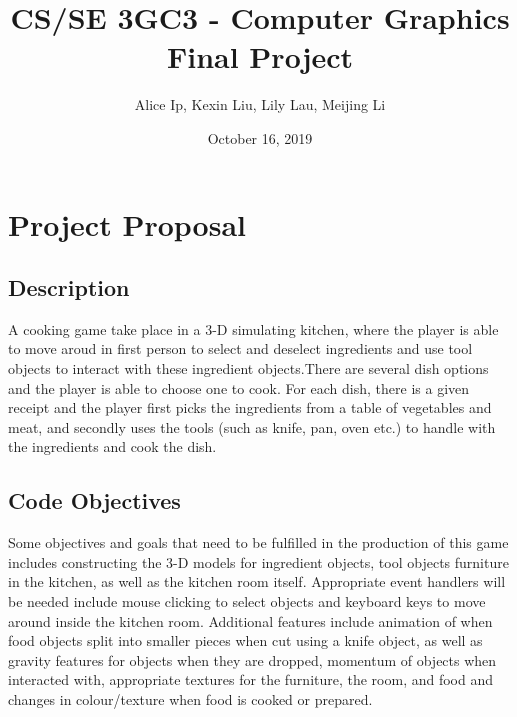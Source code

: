 \documentclass[11pt]{article}
\author{Alice Ip, Kexin Liu, Lily Lau, Meijing Li}
\date{October 16, 2019}
\title{CS/SE 3GC3 - Computer Graphics Final Project}
\begin{document}
\maketitle

\section*{Project Proposal}
\label{sec:org4e95926}

\subsection*{Description}
\label{sec:orgfa6e35b}
A cooking game take place in a 3-D simulating kitchen, where the player is able 
to move aroud in first person to select and deselect ingredients and use tool 
objects to interact with these ingredient objects.There are several dish options
 and the player is able to choose one to cook. 
For each dish, there is a given receipt and the player first picks the 
ingredients from a table of vegetables and meat, and secondly uses the tools
(such as knife, pan, oven etc.) to handle with the ingredients and cook the
dish.

\subsection*{Code Objectives}
\label{sec:orgc8f7b4b}
Some objectives and goals that need to be fulfilled in the production of this 
game includes constructing the 3-D models for ingredient objects, tool objects
furniture in the kitchen, as well as the kitchen room itself. Appropriate event
handlers will be needed include mouse clicking to select objects and keyboard keys
to move around inside the kitchen room. Additional features include animation 
of when food objects split into smaller pieces when cut using a knife object, as 
well as gravity features for objects when they are dropped, momentum of objects
when interacted with, appropriate textures for the furniture, the room, and food
and changes in colour/texture when food is cooked or prepared.
\end{document}
